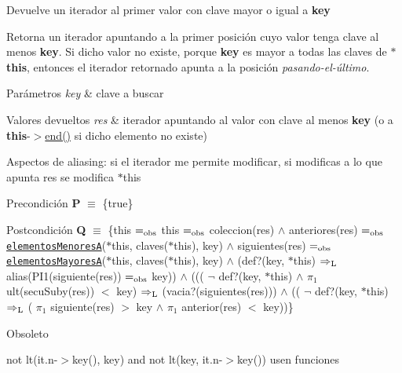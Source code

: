 Devuelve un iterador al primer valor con clave mayor o igual a {\bfseries key} 

Retorna un iterador apuntando a la primer posición cuyo valor tenga clave al menos {\bfseries key}. Si dicho valor no existe, porque {\bfseries key} es mayor a todas las claves de {\bfseries $\ast$this}, entonces el iterador retornado apunta a la posición {\itshape pasando-\/el-\/último}.


\begin{DoxyParams}{Parámetros}
{\em key} & clave a buscar \\
\hline
\end{DoxyParams}

\begin{DoxyRetVals}{Valores devueltos}
{\em res} & iterador apuntando al valor con clave al menos {\bfseries key} (o a {\bfseries this}-\/$>$\hyperlink{classaed2_1_1map_a76023e6a56cb625513e1b5ea028bf983_a76023e6a56cb625513e1b5ea028bf983}{end()} si dicho elemento no existe)\\
\hline
\end{DoxyRetVals}
\begin{DoxyParagraph}{Aspectos de aliasing\+:}
si el iterador me permite modificar, si modificas a lo que apunta res se modifica $\ast$this
\end{DoxyParagraph}
\begin{DoxyPrecond}{Precondición}
{\bfseries P} $\equiv$ \{true\} 
\end{DoxyPrecond}
\begin{DoxyPostcond}{Postcondición}
{\bfseries Q} $\equiv$ \{this $=_{\rm obs}$ this $=_{\rm obs}$ coleccion(res) $\land$ anteriores(res) $=_{\rm obs}$ \href{axiomas.html#elementosMenoresA}{\tt elementos\+MenoresA}($\ast$this, claves($\ast$this), key) $\land$ siguientes(res) $=_{\rm obs}$ \href{axiomas.html#elementosMayoresA}{\tt elementos\+MayoresA}($\ast$this, claves($\ast$this), key) $\land$ (def?(key, $\ast$this) $\Rightarrow_{\rm L}$ alias(P\+I1(siguiente(res)) $=_{\rm obs}$ key)) $\land$ ((( $\lnot$ def?(key, $\ast$this) $\land$ $\pi_1$ ult(secu\+Suby(res)) $<$ key) $\Rightarrow_{\rm L}$ (vacia?(siguientes(res))) $\land$ (( $\lnot$ def?(key, $\ast$this) $\Rightarrow_{\rm L}$ ( $\pi_1$ siguiente(res) $>$ key $\land$ $\pi_1$ anterior(res) $<$ key))\}
\end{DoxyPostcond}
\begin{DoxyRefDesc}{Obsoleto}
\item[\hyperlink{deprecated__deprecated000011}{Obsoleto}]not lt(it.\+n-\/$>$key(), key) and not lt(key, it.\+n-\/$>$key()) usen funciones\end{DoxyRefDesc}



